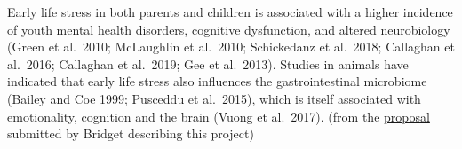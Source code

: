 \documentclass[
]{book}
\begin{document}
Early life stress in both parents and children is associated with a higher incidence of youth mental health disorders, cognitive dysfunction, and altered neurobiology (Green et al.~2010; McLaughlin et al.~2010; Schickedanz et al.~2018; Callaghan et al.~2016; Callaghan et al.~2019; Gee et al.~2013). Studies in animals have indicated that early life stress also influences the gastrointestinal microbiome (Bailey and Coe 1999; Pusceddu et al.~2015), which is itself associated with emotionality, cognition and the brain (Vuong et al.~2017). (from the \href{https://ucla.app.box.com/file/740587024475}{proposal} submitted by Bridget describing this project)

  
\end{document}
